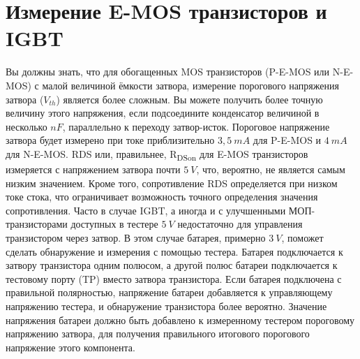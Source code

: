 \section{Измерение E-MOS транзисторов и IGBT}
Вы должны знать, что для обогащенных MOS транзисторов (P-E-MOS или N-E-MOS) с малой величиной ёмкости затвора,
измерение порогового напряжения затвора (\(V_{th}\)) является более сложным.
Вы можете получить более точную величину этого напряжения, если подсоедините конденсатор величиной в несколько
\(nF\), параллельно к переходу затвор-исток.
Пороговое напряжение затвора будет измерено при токе приблизительно \(3,5~mA\) для P-E-MOS и \(4~mA\) для N-E-MOS.
RDS или, правильнее, R\textsubscript{DSon} для E-MOS транзисторов измеряется с напряжением затвора почти \(5~V\),
что, вероятно, не является самым низким значением.
Кроме того, сопротивление RDS определяется при низком токе стока, что ограничивает возможность точного 
определения значения сопротивления.
Часто в случае IGBT, а иногда и с улучшенными МОП-транзисторами доступных в тестере \(5~V\) недостаточно для 
управления транзистором через затвор.
В этом случае батарея, примерно \(3~V\), поможет сделать обнаружение и измерения с помощью тестера.
Батарея подключается к затвору транзистора одним полюсом, а другой полюс батареи подключается к тестовому порту (TP) 
вместо затвора транзистора.
Если батарея подключена с правильной полярностью, напряжение батареи добавляется к управляющему напряжению тестера,
и обнаружение транзистора более вероятно.
Значение напряжения батареи должно быть добавлено к измеренному тестером пороговому напряжению затвора, 
для получения правильного итогового порогового напряжение этого компонента.

